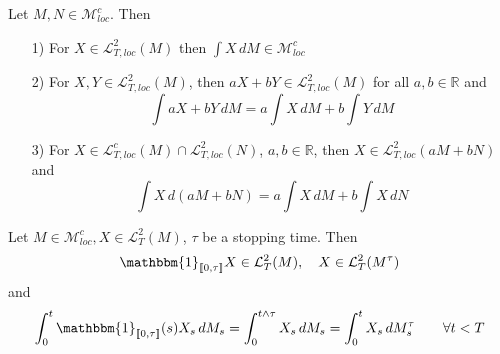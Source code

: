 \documentclass[12pt,a4paper]{article}
\newcommand{\R}{\mathbb{R}}
\begin{document}
\pagebreak
\begin{proposition}{}{}
    Let $M,N\in\mathcal{M}_{loc}^c$. Then
    \begin{enumerate}
        \item[1)] For $X\in\mathcal{L}^2_{T,loc}(M)$ then $\int X\, dM\in \mathcal{M}^c_{loc}$
        \item[2)] For $X,Y\in \mathcal{L}^2_{T,loc}(M)$, then $aX+bY\in\mathcal{L}^2_{T,loc}(M)$ for all $a,b\in\R$ and
        $$
        \int aX+bY \,dM = a\int X\,dM + b\int Y\, dM
        $$
        \item[3)] For $X\in\mathcal{L}^c_{T,loc}(M)\cap \mathcal{L}^2_{T,loc}(N)$, $a,b\in\R$, then $X\in\mathcal{L}^2_{T,loc}(aM+bN)$ and 
        $$
        \int X\,d(aM+bN) = a\int X\,dM + b\int X\, dN
        $$
    \end{enumerate}
\end{proposition}
\begin{theorem}{}{}
    Let $M\in\mathcal{M}^c_{loc}, X\in \mathcal{L}^2_T(M)$, $\tau$ be a stopping time. Then
    $$
    \mathbbm{1}_{\llbracket 0,\tau\rrbracket}X\in\mathcal{L}^2_T(M), \quad X\in\mathcal{L}^2_T(M^{\tau})
    $$
    and 
    $$
    \int_0^t \mathbbm{1}_{\llbracket 0,\tau\rrbracket}(s)X_s\,dM_s = \int_0^{t\wedge\tau} X_s\,dM_s = \int_0^t X_s\,dM^\tau_s \qquad\forall t<T
    $$
\end{theorem}
\pagebreak
\end{document}
